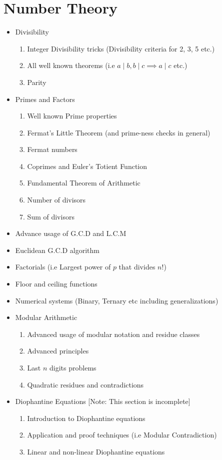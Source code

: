 \documentclass[oneside]{book}
\begin{document}
\section{Number Theory}
\begin{itemize}
    \item Divisibility
    \begin{enumerate}
      \item Integer Divisibility tricks (Divisibility criteria for 2, 3, 5 etc.)
      \item All well known theorems (i.e $a \mid b, b \mid c \implies a \mid c$ etc.)
      \item Parity
  \end{enumerate}
  \item Primes and Factors
    \begin{enumerate}
      \item Well known Prime properties
      \item Fermat's Little Theorem (and prime-ness checks in general)
      \item Fermat numbers
      \item Coprimes and Euler's Totient Function
      \item Fundamental Theorem of Arithmetic
      \item Number of divisors
      \item Sum of divisors
  \end{enumerate}
  \item Advance usage of G.C.D and L.C.M
  \item Euclidean G.C.D algorithm
  \item Factorials (i.e Largest power of $p$ that divides $n!$)
  \item Floor and ceiling functions
  \item Numerical systems (Binary, Ternary etc including generalizations)
  \item Modular Arithmetic
    \begin{enumerate}
      \item Advanced usage of modular notation and residue classes
      \item Advanced principles
      \item Last $n$ digits problems
      \item Quadratic residues and contradictions
  \end{enumerate}
  \item Diophantine Equations [Note: This section is incomplete]
    \begin{enumerate}
        \item Introduction to Diophantine equations
        \item Application and proof techniques (i.e Modular Contradiction)
        \item Linear and non-linear Diophantine equations
    \end{enumerate}
\end{itemize}
\end{document}
